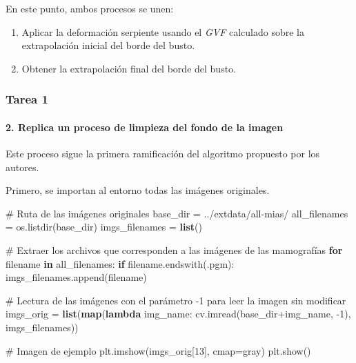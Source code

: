 \documentclass[
]{article}
\newenvironment{Shaded}{\begin{snugshade}}{\end{snugshade}}
\newcommand{\BuiltInTok}[1]{\textcolor[rgb]{0.39,0.29,0.61}{\textbf{#1}}}
\newcommand{\CommentTok}[1]{\textcolor[rgb]{0.54,0.53,0.53}{#1}}
\newcommand{\ControlFlowTok}[1]{\textcolor[rgb]{0.12,0.11,0.11}{\textbf{#1}}}
\newcommand{\DecValTok}[1]{\textcolor[rgb]{0.69,0.50,0.00}{#1}}
\newcommand{\KeywordTok}[1]{\textcolor[rgb]{0.12,0.11,0.11}{\textbf{#1}}}
\newcommand{\NormalTok}[1]{\textcolor[rgb]{0.12,0.11,0.11}{#1}}
\newcommand{\OperatorTok}[1]{\textcolor[rgb]{0.12,0.11,0.11}{#1}}
\newcommand{\StringTok}[1]{\textcolor[rgb]{0.75,0.01,0.01}{#1}}
\providecommand{\tightlist}{%
  \setlength{\itemsep}{0pt}\setlength{\parskip}{0pt}}
\begin{document}
En este punto, ambos procesos se unen:

\begin{enumerate}
\def\labelenumi{\arabic{enumi}.}
\setcounter{enumi}{5}
\tightlist
\item
  Aplicar la deformación serpiente usando el \emph{GVF} calculado sobre
  la extrapolación inicial del borde del busto.
\item
  Obtener la extrapolación final del borde del busto.
\end{enumerate}

\hypertarget{tarea-1}{%
\subsubsection{Tarea 1}\label{tarea-1}}

\hypertarget{replica-un-proceso-de-limpieza-del-fondo-de-la-imagen}{%
\paragraph{2. Replica un proceso de limpieza del fondo de la
imagen}\label{replica-un-proceso-de-limpieza-del-fondo-de-la-imagen}}

Este proceso sigue la primera ramificación del algoritmo propuesto por
los autores.

Primero, se importan al entorno todas las imágenes originales.

\begin{Shaded}
\begin{Highlighting}[]
\CommentTok{\# Ruta de las imágenes originales}
\NormalTok{base\_dir }\OperatorTok{=} \StringTok{\textquotesingle{}../extdata/all{-}mias/\textquotesingle{}}
\NormalTok{all\_filenames }\OperatorTok{=}\NormalTok{ os.listdir(base\_dir)}
\NormalTok{imgs\_filenames }\OperatorTok{=} \BuiltInTok{list}\NormalTok{()}

\CommentTok{\# Extraer los archivos que corresponden a las imágenes de las mamografías}
\ControlFlowTok{for}\NormalTok{ filename }\KeywordTok{in}\NormalTok{ all\_filenames:}
    \ControlFlowTok{if}\NormalTok{ filename.endswith(}\StringTok{\textquotesingle{}.pgm\textquotesingle{}}\NormalTok{):}
\NormalTok{        imgs\_filenames.append(filename)}

\CommentTok{\# Lectura de las imágenes con el parámetro {-}1 para leer la imagen sin modificar}
\NormalTok{imgs\_orig }\OperatorTok{=} \BuiltInTok{list}\NormalTok{(}\BuiltInTok{map}\NormalTok{(}\KeywordTok{lambda}\NormalTok{ img\_name: cv.imread(base\_dir}\OperatorTok{+}\NormalTok{img\_name, }\OperatorTok{{-}}\DecValTok{1}\NormalTok{), imgs\_filenames))}

\CommentTok{\# Imagen de ejemplo}
\NormalTok{plt.imshow(imgs\_orig[}\DecValTok{13}\NormalTok{], cmap}\OperatorTok{=}\StringTok{\textquotesingle{}gray\textquotesingle{}}\NormalTok{)}
\NormalTok{plt.show()}
\end{Highlighting}
\end{Shaded}
\end{document}
